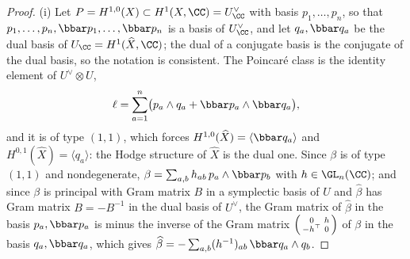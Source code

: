 \begin{proof}
(i) Let $P=H^{1,0}(X)\subset H^{1}(X,\CC)=U^{\vee}_{\CC}$ with basis
$p_{1},\dots,p_{n}$, so that $p_{1},\dots,p_{n},\bbar p_{1},\dots,\bbar p_{n}$
is a basis of $U^{\vee}_{\CC}$, and let $q_{a},\bbar q_{a}$ be the dual basis
of $U_{\CC}=H^{1}(\widehat X,\CC)$; the dual of a conjugate basis is the
conjugate of the dual basis, so the notation is consistent. The Poincar\'e
class is the identity element of $U^{\vee}\otimes U$,
\[
  \ell=\sum_{a=1}^{n}\bigl(p_{a}\wedge q_{a}+\bbar p_{a}\wedge\bbar q_{a}\bigr),
\]
and it is of type $(1,1)$, which forces $H^{1,0}(\widehat X)=\langle\bbar
q_{a}\rangle$ and $H^{0,1}(\widehat X)=\langle q_{a}\rangle$: the Hodge
structure of $\widehat X$ is the dual one. Since $\beta$ is of type $(1,1)$
and nondegenerate, $\beta=\sum_{a,b}h_{ab}\,p_{a}\wedge\bbar p_{b}$ with
$h\in\GL_{n}(\CC)$; and since $\beta$ is principal with Gram matrix $B$ in a
symplectic basis of $U$ and $\widehat\beta$ has Gram matrix $B=-B^{-1}$ in
the dual basis of $U^{\vee}$, the Gram matrix of $\widehat\beta$ in the
basis $p_{a},\bbar p_{a}$ is minus the inverse of the Gram matrix
$\begin{psmallmatrix}0&h\\-h^{\top}&0\end{psmallmatrix}$ of $\beta$ in the
basis $q_{a},\bbar q_{a}$, which gives
$\widehat\beta=-\sum_{a,b}(h^{-1})_{ab}\,\bbar q_{a}\wedge q_{b}$.


\end{proof}
